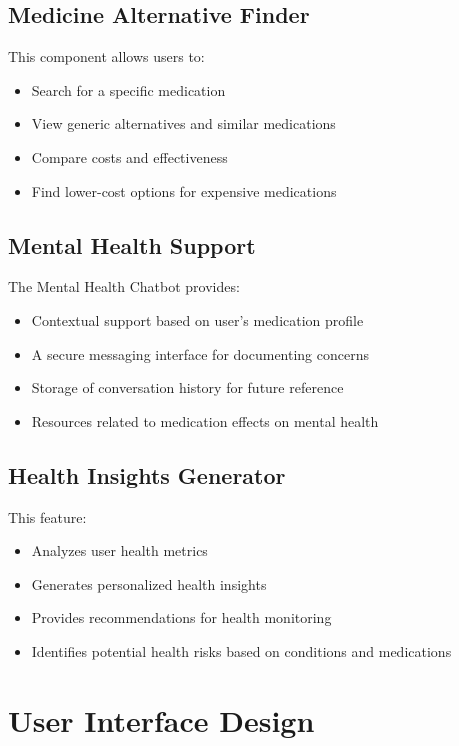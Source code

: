 \documentclass[12pt,a4paper]{report}
\begin{document}
\section{Medicine Alternative Finder}
This component allows users to:
\begin{itemize}
    \item Search for a specific medication
    \item View generic alternatives and similar medications
    \item Compare costs and effectiveness
    \item Find lower-cost options for expensive medications
\end{itemize}

\section{Mental Health Support}
The Mental Health Chatbot provides:
\begin{itemize}
    \item Contextual support based on user's medication profile
    \item A secure messaging interface for documenting concerns
    \item Storage of conversation history for future reference
    \item Resources related to medication effects on mental health
\end{itemize}

\section{Health Insights Generator}
This feature:
\begin{itemize}
    \item Analyzes user health metrics
    \item Generates personalized health insights
    \item Provides recommendations for health monitoring
    \item Identifies potential health risks based on conditions and medications
\end{itemize}

\chapter{User Interface Design}
\end{document}
